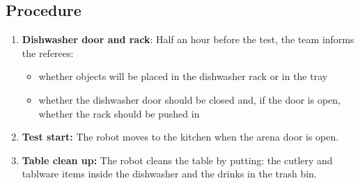 \subsection*{Procedure}
\begin{enumerate}[nosep]
	\item \textbf{Dishwasher door and rack}: Half an hour before the test, the team informs the referees:
		\begin{itemize}
			\item whether objects will be placed in the dishwasher rack or in the tray
			\item whether the dishwasher door should be closed and, if the door is open, whether the rack should be pushed in
		\end{itemize}
	\item \textbf{Test start:} The robot moves to the kitchen when the arena door is open.
	\item \textbf{Table clean up:} The robot cleans the table by putting: the cutlery and tablware items inside the dishwasher and the drinks in the trash bin.
\end{enumerate}


